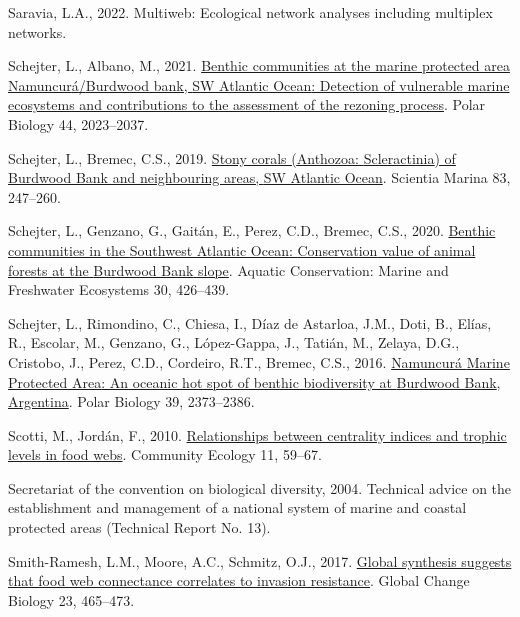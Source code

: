 \documentclass[
]{article}
\newlength{\cslhangindent}
\newenvironment{CSLReferences}[2] %
 {\begin{list}{}{%
  \setlength{\itemindent}{0pt}
  \setlength{\leftmargin}{0pt}
  \setlength{\parsep}{0pt}
  \ifodd #1
   \setlength{\leftmargin}{\cslhangindent}
   \setlength{\itemindent}{-1\cslhangindent}
  \fi
  \setlength{\itemsep}{#2\baselineskip}}}
 {\end{list}}
\begin{document}
\begin{CSLReferences}{1}{0}
Saravia, L.A., 2022. Multiweb: {Ecological} network analyses including
multiplex networks.

Schejter, L., Albano, M., 2021.
\href{https://doi.org/10.1007/s00300-021-02936-y}{Benthic communities at
the marine protected area {Namuncur{á}}/{Burdwood} bank, {SW Atlantic
Ocean}: Detection of vulnerable marine ecosystems and contributions to
the assessment of the rezoning process}. Polar Biology 44, 2023--2037.

Schejter, L., Bremec, C.S., 2019.
\href{https://doi.org/10.3989/scimar.04863.10A}{Stony corals
({Anthozoa}: {Scleractinia}) of {Burdwood Bank} and neighbouring areas,
{SW Atlantic Ocean}}. Scientia Marina 83, 247--260.

Schejter, L., Genzano, G., Gaitán, E., Perez, C.D., Bremec, C.S., 2020.
\href{https://doi.org/10.1002/aqc.3265}{Benthic communities in the
{Southwest Atlantic Ocean}: {Conservation} value of animal forests at
the {Burdwood Bank} slope}. Aquatic Conservation: Marine and Freshwater
Ecosystems 30, 426--439.

Schejter, L., Rimondino, C., Chiesa, I., Díaz de Astarloa, J.M., Doti,
B., Elías, R., Escolar, M., Genzano, G., López-Gappa, J., Tatián, M.,
Zelaya, D.G., Cristobo, J., Perez, C.D., Cordeiro, R.T., Bremec, C.S.,
2016. \href{https://doi.org/10.1007/s00300-016-1913-2}{Namuncur{á}
{Marine Protected Area}: An oceanic hot spot of benthic biodiversity at
{Burdwood Bank}, {Argentina}}. Polar Biology 39, 2373--2386.

Scotti, M., Jordán, F., 2010.
\href{https://doi.org/10.1556/ComEc.11.2010.1.9}{Relationships between
centrality indices and trophic levels in food webs}. Community Ecology
11, 59--67.

Secretariat of the convention on biological diversity, 2004. Technical
advice on the establishment and management of a national system of
marine and coastal protected areas (Technical Report No. 13).

Smith-Ramesh, L.M., Moore, A.C., Schmitz, O.J., 2017.
\href{https://doi.org/10.1111/gcb.13460}{Global synthesis suggests that
food web connectance correlates to invasion resistance}. Global Change
Biology 23, 465--473.


\end{CSLReferences}
\end{document}
